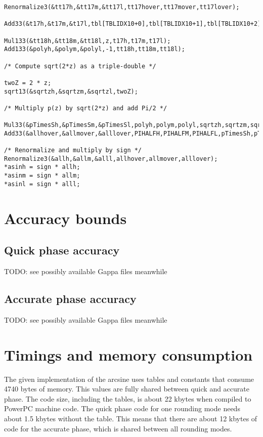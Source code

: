 \begin{lstlisting}[caption={High path accurate phase polynomial approximation},firstnumber=1]
Renormalize3(&tt17h,&tt17m,&tt17l,tt17hover,tt17mover,tt17lover);

Add33(&t17h,&t17m,&t17l,tbl[TBLIDX10+0],tbl[TBLIDX10+1],tbl[TBLIDX10+2],tt17h,tt17m,tt17l);

Mul133(&tt18h,&tt18m,&tt18l,z,t17h,t17m,t17l);
Add133(&polyh,&polym,&polyl,-1,tt18h,tt18m,tt18l);

/* Compute sqrt(2*z) as a triple-double */

twoZ = 2 * z;
sqrt13(&sqrtzh,&sqrtzm,&sqrtzl,twoZ);

/* Multiply p(z) by sqrt(2*z) and add Pi/2 */

Mul33(&pTimesSh,&pTimesSm,&pTimesSl,polyh,polym,polyl,sqrtzh,sqrtzm,sqrtzl);
Add33(&allhover,&allmover,&alllover,PIHALFH,PIHALFM,PIHALFL,pTimesSh,pTimesSm,pTimesSl);

/* Renormalize and multiply by sign */
Renormalize3(&allh,&allm,&alll,allhover,allmover,alllover);
*asinh = sign * allh;
*asinm = sign * allm;
*asinl = sign * alll;
\end{lstlisting}

\section{Accuracy bounds}\label{sec:asinaccuracy}

\subsection{Quick phase accuracy}\label{subsec:asinquickphaseaccu}

TODO: see possibly available Gappa files meanwhile


\subsection{Accurate phase accuracy}\label{subsec:asinaccuratephaseaccu}

TODO: see possibly available Gappa files meanwhile


\section{Timings and memory consumption}\label{sec:asintimingmemory}
The given implementation of the arcsine uses tables and constants that
consume 4740 bytes of memory. This values are fully shared between
quick and accurate phase. The code size, including the tables, is
about 22 kbytes when compiled to PowerPC machine code. The quick phase
code for one rounding mode needs about 1.5 kbytes without the table.
This means that there are about 12 kbytes of code for the accurate
phase, which is shared between all rounding modes.

